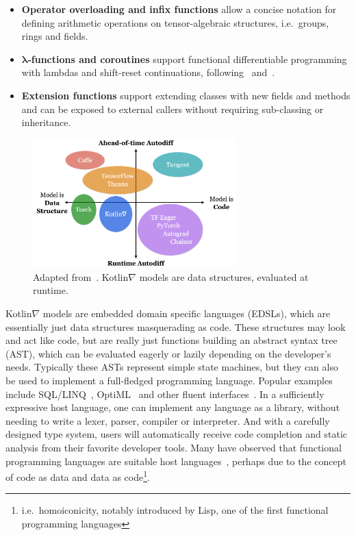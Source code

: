 \documentclass[12pt,initial,twoside,maitrise]{dms}
\numberwithin{equation}{section}
\numberwithin{table}{chapter}
\numberwithin{figure}{chapter}
\begin{document}
\begin{itemize}
\item \textbf{Operator overloading and infix functions} allow a concise notation for defining arithmetic operations on tensor-algebraic structures, i.e.\ groups, rings and fields.
\item \textbf{$\mathbf{\lambda}$-functions and coroutines} support functional differentiable programming with lambdas and shift-reset continuations, following~\cite{pearlmutter2008reverse} and~\cite{DBLP:journals-corr-abs-1803-10228}.
\item \textbf{Extension functions} support extending classes with new fields and methods and can be exposed to external callers without requiring sub-classing or inheritance.
\end{itemize}

\begin{figure}
    \centering
    \includegraphics[width=0.70\textwidth]{kotlingrad_diagram.png}
    \caption{Adapted from~\cite{van2018tangent}. Kotlin$\nabla$ models are data structures, evaluated at runtime.}
    \label{fig:kotlingrad_digram}
\end{figure}

Kotlin$\nabla$ models are embedded domain specific languages (EDSLs), which are essentially just data structures masquerading as code. These structures may look and act like code, but are really just functions building an abstract syntax tree (AST), which can be evaluated eagerly or lazily depending on the developer's needs. Typically these ASTs represent simple state machines, but they can also be used to implement a full-fledged programming language. Popular examples include SQL/LINQ~\cite{meijer2006linq}, OptiML~\cite{sujeeth2011optiml} and other fluent interfaces~\cite{fowler05fluent}. In a sufficiently expressive host language, one can implement any language as a library, without needing to write a lexer, parser, compiler or interpreter. And with a carefully designed type system, users will automatically receive code completion and static analysis from their favorite developer tools. Many have observed that functional programming languages are suitable host languages~\cite{elliott2003compiling,rompf2010lightweight}, perhaps due to the concept of code as data and data as code\footnote{i.e.\ homoiconicity, notably introduced by Lisp, one of the first functional programming languages}.
\end{document}
